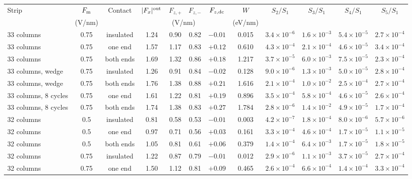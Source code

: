 \begin{tabular}{lccccccccccc}
\hline\hline
Strip & $F_{\rm m}$ & Contact & $|F_x|^{\rm out}$ & $F_{z,+}$ & $F_{z,-}$ & $F_{z,{\rm dc}}$ & $W$ & $S_2/S_1$ & $S_3/S_1$ & $S_4/S_1$ & $S_5/S_1$ \\
 & (V/nm) & & \multicolumn{4}{c}{(V/nm)} & (eV/nm) & & & & \\
\hline
33 columns & 0.75 & insulated & 1.24 & 0.90 & 0.82 & $-0.01$ & 0.015 & $3.4\times10^{-6}$ & $1.6\times10^{-3}$ & $5.4\times10^{-5}$ & $2.7\times10^{-4}$ \\
33 columns & 0.75 & one end & 1.57 & 1.17 & 0.83 & $+0.12$ & 0.610 & $4.3\times10^{-4}$ & $2.1\times10^{-4}$ & $4.6\times10^{-5}$ & $3.4\times10^{-4}$ \\
33 columns & 0.75 & both ends & 1.69 & 1.32 & 0.86 & $+0.18$ & 1.217 & $3.7\times10^{-5}$ & $6.0\times10^{-3}$ & $7.5\times10^{-5}$ & $2.3\times10^{-4}$ \\
\hline
33 columns, wedge & 0.75 & insulated & 1.26 & 0.91 & 0.84 & $-0.02$ & 0.128 & $9.0\times10^{-6}$ & $1.3\times10^{-3}$ & $5.0\times10^{-5}$ & $2.8\times10^{-4}$ \\
33 columns, wedge & 0.75 & both ends & 1.76 & 1.38 & 0.88 & $+0.21$ & 1.616 & $2.1\times10^{-4}$ & $1.0\times10^{-2}$ & $2.5\times10^{-4}$ & $2.7\times10^{-4}$ \\
\hline
33 columns, 8 cycles & 0.75 & one end & 1.61 & 1.22 & 0.81 & $+0.19$ & 0.896 & $3.5\times10^{-4}$ & $5.8\times10^{-4}$ & $4.6\times10^{-5}$ & $2.6\times10^{-4}$ \\
33 columns, 8 cycles & 0.75 & both ends & 1.74 & 1.38 & 0.83 & $+0.27$ & 1.784 & $2.8\times10^{-6}$ & $1.4\times10^{-2}$ & $4.9\times10^{-5}$ & $1.7\times10^{-4}$ \\
\hline
32 columns & 0.5 & insulated & 0.81 & 0.58 & 0.53 & $-0.01$ & 0.003 & $4.2\times10^{-7}$ & $1.8\times10^{-4}$ & $8.0\times10^{-6}$ & $5.7\times10^{-6}$ \\
32 columns & 0.5 & one end & 0.97 & 0.71 & 0.56 & $+0.03$ & 0.161 & $3.3\times10^{-4}$ & $4.6\times10^{-4}$ & $1.7\times10^{-5}$ & $1.1\times10^{-5}$ \\
32 columns & 0.5 & both ends & 1.05 & 0.81 & 0.61 & $+0.06$ & 0.379 & $1.4\times10^{-4}$ & $6.4\times10^{-3}$ & $1.7\times10^{-5}$ & $1.8\times10^{-5}$ \\
\hline
32 columns & 0.75 & insulated & 1.22 & 0.87 & 0.79 & $-0.01$ & 0.012 & $2.9\times10^{-6}$ & $1.1\times10^{-3}$ & $3.7\times10^{-5}$ & $2.7\times10^{-4}$ \\
32 columns & 0.75 & one end & 1.50 & 1.12 & 0.81 & $+0.09$ & 0.465 & $2.6\times10^{-4}$ & $6.6\times10^{-4}$ & $1.4\times10^{-4}$ & $3.3\times10^{-4}$ \\

\end{tabular}
